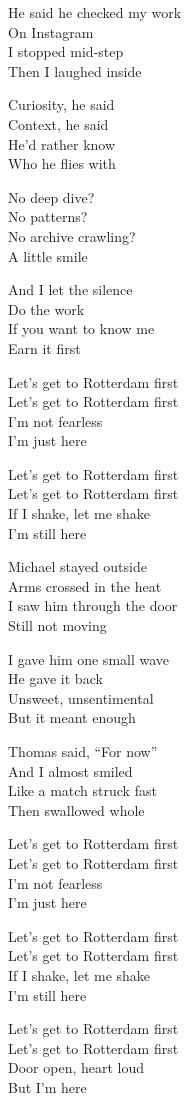 \begin{lyrics}
He said he checked my work\\
On Instagram\\
I stopped mid-step\\
Then I laughed inside

Curiosity, he said\\
Context, he said\\
He’d rather know\\
Who he flies with

No deep dive?\\
No patterns?\\
No archive crawling?\\
A little smile

And I let the silence\\
Do the work\\
If you want to know me\\
Earn it first

Let’s get to Rotterdam first\\
Let’s get to Rotterdam first\\
I’m not fearless\\
I’m just here

Let’s get to Rotterdam first\\
Let’s get to Rotterdam first\\
If I shake, let me shake\\
I’m still here

Michael stayed outside\\
Arms crossed in the heat\\
I saw him through the door\\
Still not moving

I gave him one small wave\\
He gave it back\\
Unsweet, unsentimental\\
But it meant enough

Thomas said, “For now”\\
And I almost smiled\\
Like a match struck fast\\
Then swallowed whole

Let’s get to Rotterdam first\\
Let’s get to Rotterdam first\\
I’m not fearless\\
I’m just here

Let’s get to Rotterdam first\\
Let’s get to Rotterdam first\\
If I shake, let me shake\\
I’m still here

Let’s get to Rotterdam first\\
Let’s get to Rotterdam first\\
Door open, heart loud\\
But I’m here
\end{lyrics}

